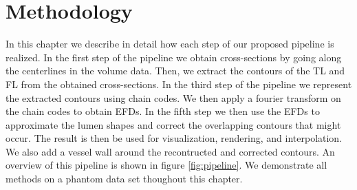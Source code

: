 \documentclass[thesis.tex]{subfiles}
\begin{document}
\chapter{Methodology}\label{chap:basics}

In this chapter we describe in detail how each step of our proposed pipeline is realized. In the first step of the pipeline we obtain cross-sections by going along the centerlines in the volume data. Then, we extract the contours of the TL and FL from the obtained cross-sections. In the third step of the pipeline we represent the extracted contours using chain codes. We then apply a fourier transform on the chain codes to obtain EFDs. In the fifth step we then use the EFDs to approximate the lumen shapes and correct the overlapping contours that might occur. The result is then be used for visualization, rendering, and interpolation. We also add a vessel wall around the recontructed and corrected contours. An overview of this pipeline is shown in figure \ref{fig:pipeline}. We demonstrate all methods on a phantom data set thoughout this chapter. 
\end{document}
